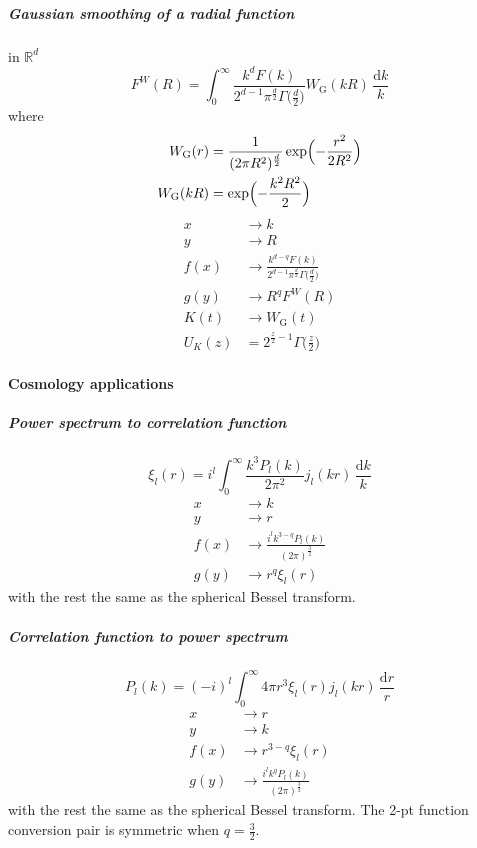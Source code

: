 \documentclass{article}
\renewcommand{\d}{\mathrm{d}}
\newcommand{\Gauss}{\textrm{G}}
\begin{document}
\subparagraph{Gaussian smoothing of a radial function}
in $\mathbb{R}^d$
\begin{equation}
    F^W(R) = \int_0^\infty \frac{k^dF(k)}{2^{d-1}\pi^\frac{d}2\Gamma\bigl(\frac{d}2\bigr)}
                    W_\Gauss(kR) \,\frac{\d k}k
\end{equation}
where
\begin{align}
    W_\Gauss(r) &= \frac1{(2\pi R^2)^\frac{d}2} \exp\Bigl(-\frac{r^2}{2R^2}\Bigr)  \\
    W_\Gauss(kR) &= \exp\Bigl(-\frac{k^2R^2}2\Bigr)
\end{align}
\begin{align}
    x &\to k  \\
    y &\to R  \\
    f(x) &\to \frac{k^{d-q}F(k)}{2^{d-1}\pi^\frac{d}2\Gamma\bigl(\frac{d}2\bigr)}  \\
    g(y) &\to R^q F^W(R)  \\
    K(t) &\to W_\Gauss(t)  \\
    U_K(z) &= 2^{\frac{z}2-1} \Gamma\bigl(\tfrac{z}2\bigr)
\end{align}


\paragraph{Cosmology applications}


\subparagraph{Power spectrum to correlation function}
\begin{equation}
    \xi_l(r) = i^l \int_0^\infty \frac{k^3P_l(k)}{2\pi^2} j_l(kr) \,\frac{\d k}k
\end{equation}
\begin{align}
    x &\to k  \\
    y &\to r  \\
    f(x) &\to \frac{i^l k^{3-q} P_l(k)}{(2\pi)^\frac32}  \\
    g(y) &\to r^q \xi_l(r)
\end{align}
with the rest the same as the spherical Bessel transform.


\subparagraph{Correlation function to power spectrum}
\begin{equation}
    P_l(k) = (-i)^l \int_0^\infty 4\pi r^3\xi_l(r) j_l(kr) \,\frac{\d r}r
\end{equation}
\begin{align}
    x &\to r  \\
    y &\to k  \\
    f(x) &\to r^{3-q} \xi_l(r)  \\
    g(y) &\to \frac{i^l k^q P_l(k)}{(2\pi)^\frac32}
\end{align}
with the rest the same as the spherical Bessel transform.
The 2-pt function conversion pair is symmetric when $q=\frac32$.
\end{document}
